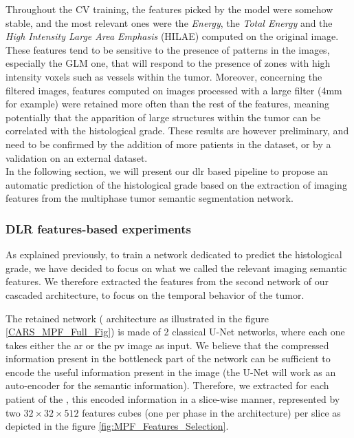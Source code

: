 {Throughout the CV training, the features picked by the model were somehow stable, and the most relevant ones were the \textit{Energy}, the \textit{Total Energy} and the \textit{High Intensity Large Area Emphasis} (HILAE) computed on the original image. These features tend to be sensitive to the presence of patterns in the images, especially the GLM one, that will respond to the presence of zones with high intensity voxels such as vessels within the tumor. Moreover, concerning the filtered images, features computed on images processed with a large filter (4mm for example) were retained more often than the rest of the features, meaning potentially that the apparition of large structures within the tumor can be correlated with the histological grade.
These results are however preliminary, and need to be confirmed by the addition of more patients in the dataset, or by a validation on an external dataset.\\
In the following section, we will present our \ac{dlr} based pipeline to propose an automatic prediction of the histological grade based on the extraction of imaging features from the multiphase tumor semantic segmentation network.
}

\subsubsection{DLR features-based experiments}

As explained previously, to train a network dedicated to predict the
histological grade, we have decided to focus on what we called the
relevant imaging semantic features.
We therefore extracted the features from the second network of our
cascaded architecture, to focus on the temporal behavior of the tumor.

The retained network ( architecture as illustrated in the figure \ref{CARS_MPF_Full_Fig}) is made of 2 classical U-Net networks, where each
one takes either the \ac{ar} or the \ac{pv} image as input. We believe
that the compressed information present in the bottleneck part of the
network can be sufficient to encode the useful information present in the
image (the U-Net will work as an auto-encoder for the semantic information). Therefore, we extracted for each patient of the \textbf{}, this
encoded information in a slice-wise manner, represented by two $ 32\times32\times512 $
features cubes (one per phase in the  architecture) per slice
as depicted in the figure \ref{fig:MPF_Features_Selection}.


